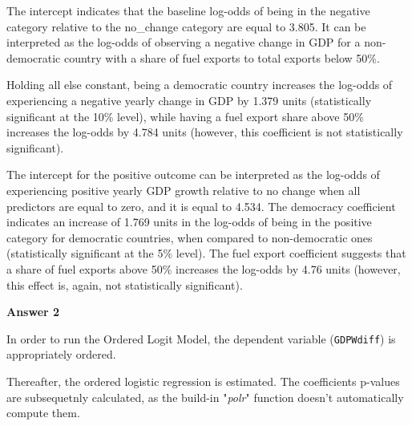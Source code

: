 \documentclass[12pt,letterpaper]{article}
\begin{document}
\noindent The intercept indicates that the baseline log-odds of being in the negative category relative to the no\_change category are equal to 3.805. It can be interpreted as the log-odds of observing a negative change in GDP for a non-democratic country with a share of fuel exports to total exports below 50\%. 

\noindent Holding all else constant, being a democratic country increases the log-odds of experiencing a negative yearly change in GDP by 1.379 units (statistically significant at the 10\% level), while having a fuel export share above 50\% increases the log-odds by 4.784 units (however, this coefficient is not statistically significant).

\noindent The intercept for the positive outcome can be interpreted as the log-odds of experiencing positive yearly GDP growth relative to no change when all predictors are equal to zero, and it is equal to 4.534. The democracy coefficient indicates an increase of 1.769 units in the log-odds of being in the positive category for democratic countries, when compared to non-democratic ones (statistically significant at the 5\% level). The fuel export coefficient suggests that a share of fuel exports above 50\% increases the log-odds by 4.76 units (however, this effect is, again, not statistically significant).


\vspace{1cm}
\noindent\textbf{Answer 2}\\
\vspace{0.5cm}

\noindent In order to run the Ordered Logit Model, the dependent variable (\texttt{GDPWdiff}) is appropriately ordered.
\vspace{0.5cm}


\vspace{0.5cm}

\noindent Thereafter, the ordered logistic regression is estimated. The coefficients p-values are subsequetnly calculated, as the build-in "\emph{polr}" function doesn't automatically compute them. 


\vspace{0.5cm}
\end{document}
